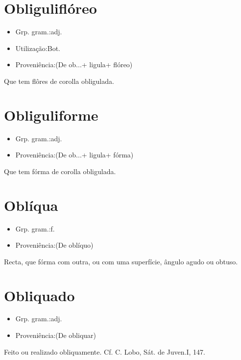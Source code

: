 \section{Obliguliflóreo}
\begin{itemize}
\item {Grp. gram.:adj.}
\end{itemize}
\begin{itemize}
\item {Utilização:Bot.}
\end{itemize}
\begin{itemize}
\item {Proveniência:(De \textunderscore ob...\textunderscore  + \textunderscore ligula\textunderscore  + \textunderscore flóreo\textunderscore )}
\end{itemize}
Que tem flôres de corolla obligulada.
\section{Obliguliforme}
\begin{itemize}
\item {Grp. gram.:adj.}
\end{itemize}
\begin{itemize}
\item {Proveniência:(De \textunderscore ob...\textunderscore  + \textunderscore ligula\textunderscore  + \textunderscore fórma\textunderscore )}
\end{itemize}
Que tem fórma de corolla obligulada.
\section{Oblíqua}
\begin{itemize}
\item {Grp. gram.:f.}
\end{itemize}
\begin{itemize}
\item {Proveniência:(De \textunderscore oblíquo\textunderscore )}
\end{itemize}
Recta, que fórma com outra, ou com uma superfície, ângulo agudo ou obtuso.
\section{Obliquado}
\begin{itemize}
\item {Grp. gram.:adj.}
\end{itemize}
\begin{itemize}
\item {Proveniência:(De \textunderscore obliquar\textunderscore )}
\end{itemize}
Feito ou realizado obliquamente. Cf. C. Lobo, \textunderscore Sát. de Juven.\textunderscore  I, 147.
